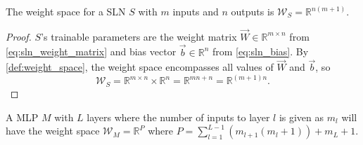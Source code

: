 \begin{lemma}
    \label{lmm:weight_space_sln}
    The weight space for a SLN $S$ with $m$ inputs and $n$ outputs is $\mathcal{W}_S = \mathbb{R}^{n(m+1)}$.
\end{lemma}
\begin{proof}
    $S$'s trainable parameters are the weight matrix $\vec{W} \in \mathbb{R}^{m\times n}$ from \ref{eq:sln_weight_matrix} and bias vector $\vec{b} \in \mathbb{R}^n$ from \ref{eq:sln_bias}.
    By \ref{def:weight_space}, the weight space encompasses all values of $\vec{W}$ and $\vec{b}$, so
    \begin{equation*}
        \mathcal{W}_S = \mathbb{R}^{m \times n} \times \mathbb{R}^{n} = \mathbb{R}^{m n + n} = \mathbb{R}^{(m + 1) n}.
    \end{equation*}
\end{proof}

\begin{lemma}
    \label{lmm:weight_space_mlp}
    A MLP $M$ with $L$ layers where the number of inputs to layer $l$ is given as $m_l$ will have the weight space $\mathcal{W}_M = \mathbb{R}^P$ where
    $P = \sum_{l=1}^{L-1}{\left(m_{l+1} (m_l + 1)\right)} + m_L + 1$.
\end{lemma}

